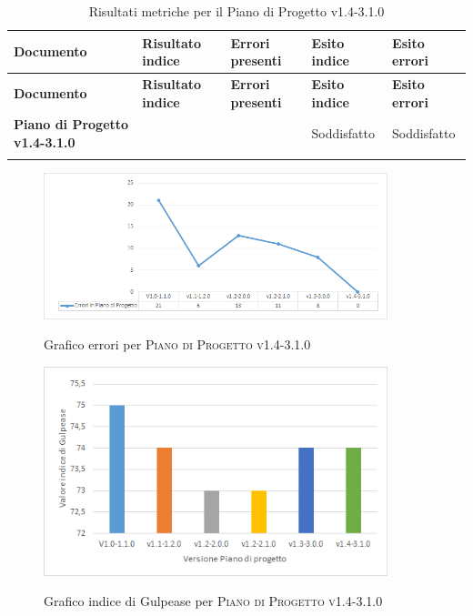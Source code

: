 \documentclass[../piano-di-qualifica.tex]{subfiles}
\begin{document}
\renewcommand{\arraystretch}{2} %
\begin{longtable}[H]{>{\centering\bfseries}m{6cm} >{\centering}m{2cm} >{\centering}m{2.5cm} >{\centering}m{2.5cm} >{\centering\arraybackslash}m{2.5cm}}  
  \rowcolor{lightgray}
  {\textbf{Documento}} & {\textbf{Risultato indice}} & {\textbf{Errori presenti}} & {\textbf{Esito indice}} & {\textbf{Esito errori}}  \\
  \endfirsthead%
  \rowcolor{lightgray}
  {\textbf{Documento}} & {\textbf{Risultato indice}} & {\textbf{Errori presenti}} & {\textbf{Esito indice}} & {\textbf{Esito errori}}  \\
  \endhead%
  \textbf{Piano di Progetto v1.4-3.1.0} & 74                 & 0               & Soddisfatto & Soddisfatto \\
  \caption{Risultati metriche per il Piano di Progetto v1.4-3.1.0}
  \label{tab:my-table}
\end{longtable}

\begin{figure}[H]
  \centering
  \includegraphics[width=10cm]{img/erroriPdPv1.4-3.1.0.png}
  \label{fig:errori_pdq}
  \caption{Grafico errori per \textsc{Piano di Progetto v1.4-3.1.0}}
\end{figure}

\begin{figure}[H]
  \centering
  \includegraphics[width=10cm]{img/gulpeasePdPv1.4-3.1.0.png}
  \label{fig:gulpease_pdq}
  \caption{Grafico indice di Gulpease per \textsc{Piano di Progetto v1.4-3.1.0}}
\end{figure}
\end{document}
